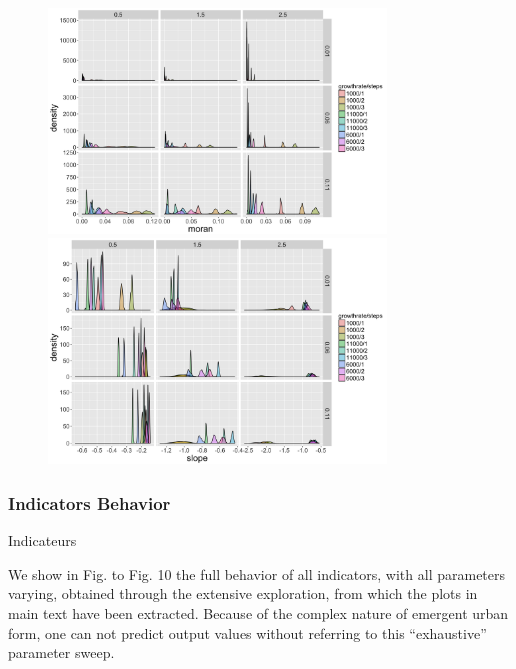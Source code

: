 \begin{figure}
\centering
\includegraphics[width=0.8\textwidth]{Figures/Density/hist_moran}\\
\includegraphics[width=0.8\textwidth]{Figures/Density/hist_slope}
\label{fig:histograms}
\end{figure}






\subsubsection{Indicators Behavior}{Indicateurs}


We show in Fig. to Fig. 10 the full behavior of all indicators, with all parameters varying, obtained through the extensive exploration, from which the plots in main text have been extracted. Because of the complex nature of emergent urban form, one can not predict output values without referring to this ``exhaustive'' parameter sweep.


